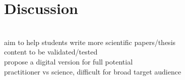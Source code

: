 
\section{Discussion}
\label{sec:discussion}
\\
aim to help students write more scientific papers/thesis\\
content to be validated/tested\\
propose a digital version for full potential\\
practitioner vs science, difficult for broad target audience \\